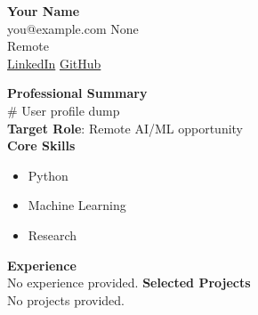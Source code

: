 \documentclass[11pt]{article}
\begin{document}
\begin{center}
{\Large \textbf{Your Name}}\\
you@example.com None\\
Remote\\
\href{https://www.linkedin.com}{LinkedIn} \quad \href{https://github.com}{GitHub}
\end{center}
\vspace{0.2cm}
\noindent\textbf{Professional Summary}\\
# User profile dump\\
\vspace{0.2cm}
\noindent\textbf{Target Role}: Remote AI/ML opportunity\\
\vspace{0.2cm}
\noindent\textbf{Core Skills}\\
\begin{itemize}[leftmargin=*]
\item {Python}
\item {Machine Learning}
\item {Research}
\end{itemize}
\vspace{0.2cm}
\noindent\textbf{Experience}\\
No experience provided.
\vspace{0.2cm}
\noindent\textbf{Selected Projects}\\
No projects provided.
\end{document}
